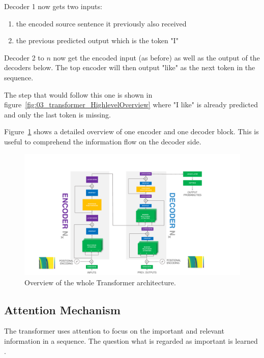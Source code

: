 Decoder 1 now gets two inputs: 

\begin{enumerate}
	\item the encoded source sentence it previously also received
	\item the previous predicted output which is the token "I"
\end{enumerate}

Decoder 2 to $n$ now get the encoded input {(as before)} as well as the output of the decoders below. The top encoder will then output "like" as the next token in the sequence. 

The step that would follow this one is shown in figure~\ref{fig:03_transformer_HighlevelOverview} where "I like" is already predicted and only the last token is missing.
\bigskip

Figure~\ref{fig:03_transformer_overview} shows a detailed overview of one encoder and one decoder block. This is useful to comprehend the information flow on the decoder side.

\begin{figure}[t]
	\centering
	\includegraphics[width=\textwidth]{figures/03_theory/03_transformerArchitectureOverview}
	\caption{Overview of the whole Transformer architecture.}
	\label{fig:03_transformer_overview}
\end{figure}

\subsection{Attention Mechanism}

The transformer uses attention to focus on the important and relevant information in a sequence. The question what is regarded as important is learned \cite{Vaswani2017d}.

